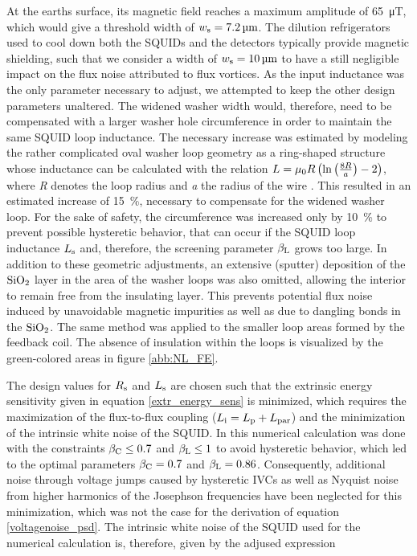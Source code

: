 At the earths surface, its magnetic field reaches a maximum amplitude of \qty{65}{\micro\tesla}, which would give a threshold width of $w_{\rm s}=\qty{7.2}{\micro\meter}$. The dilution refrigerators used to cool down both the SQUIDs and the detectors typically provide magnetic shielding, such that we consider a width of $w_{\rm s}=\qty{10}{\micro\meter}$ to have a still negligible impact on the flux noise attributed to flux vortices. As the input inductance was the only parameter necessary to adjust, we attempted to keep the other design parameters unaltered. The widened washer width would, therefore, need to be compensated with a larger washer hole circumference in order to maintain the same SQUID loop inductance. 
The necessary increase was estimated by modeling the rather complicated oval washer loop geometry as a ring-shaped structure whose inductance can be calculated with the relation $L={\rm \mu_0}R\left(\ln\left(\frac{8R}{a}\right)-2\right)$, where \textit{R} denotes the loop radius and \textit{a} the radius of the wire \cite{Dengler2016}. This resulted in an estimated increase of \qty{15}{\percent}, necessary to compensate for the widened washer loop.
For the sake of safety, the circumference was increased only by \qty{10}{\%} to prevent possible hysteretic behavior, that can occur if the SQUID loop inductance $L_{\rm s}$ and, therefore, the screening parameter $\beta_{\rm L}$ grows too large. 
In addition to these geometric adjustments, an extensive (sputter) deposition of the ${\rm SiO_2}$ layer in the area of the washer loops was also omitted, allowing the interior to remain free from the insulating layer. This prevents potential flux noise induced by unavoidable magnetic impurities as well as due to dangling bonds in the $\rm SiO_2$. The same method was applied to the smaller loop areas formed by the feedback coil. The absence of insulation within the loops is visualized by the green-colored areas in figure \ref{abb:NL_FE}.

The design values for $R_{\rm s}$ and $L_{\rm s}$ are chosen such that the extrinsic energy sensitivity given in equation \ref{extr_energy_sens} is minimized, which requires the maximization of the flux-to-flux coupling ($L_{\rm i}=L_{\rm p}+L_{\rm par}$) and the minimization of the intrinsic white noise of the SQUID. In \cite{Bauer2022} this numerical calculation was done with the constraints $\beta_{\rm C}\leq 0.7$ and $\beta_{\rm L}\leq 1$ to avoid hysteretic behavior, which led to the optimal parameters $\beta_{\rm C}=0.7$ and $\beta_{\rm L}=0.86$. Consequently, additional noise through voltage jumps caused by hysteretic IVCs as well as Nyquist noise from higher harmonics of the Josephson frequencies \cite{Clarke1996} have been neglected for this minimization, which was not the case for the derivation of equation \ref{voltagenoise_psd}. The intrinsic white noise of the SQUID used for the numerical calculation is, therefore, given by the adjused expression \cite{Knuutila1988}

